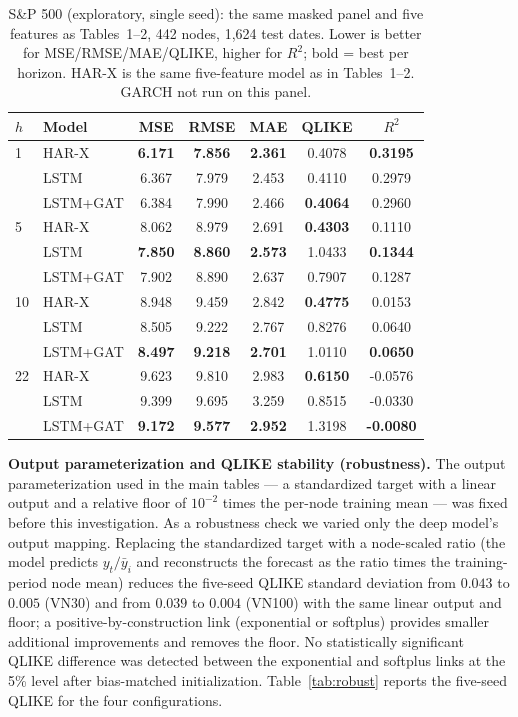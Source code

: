 \documentclass[runningheads]{llncs}
\begin{document}
\begin{table}[t]
\centering
\caption{S\&P 500 (exploratory, single seed): the same masked panel and five features as Tables~1--2, 442 nodes, 1{,}624 test dates. Lower is better for MSE/RMSE/MAE/QLIKE, higher for $R^2$; bold = best per horizon. HAR-X is the same five-feature model as in Tables~1--2. GARCH not run on this panel.}
\label{tab:sp500}
\footnotesize
\setlength{\tabcolsep}{5pt}
\begin{tabular}{llccccc}
\toprule
$h$ & Model & MSE & RMSE & MAE & QLIKE & $R^2$ \\
\midrule
1  & HAR-X     & \textbf{6.171} & \textbf{7.856} & \textbf{2.361} & 0.4078 & \textbf{0.3195} \\
   & LSTM     & 6.367 & 7.979 & 2.453 & 0.4110 & 0.2979 \\
   & LSTM+GAT & 6.384 & 7.990 & 2.466 & \textbf{0.4064} & 0.2960 \\
\midrule
5  & HAR-X     & 8.062 & 8.979 & 2.691 & \textbf{0.4303} & 0.1110 \\
   & LSTM     & \textbf{7.850} & \textbf{8.860} & \textbf{2.573} & 1.0433 & \textbf{0.1344} \\
   & LSTM+GAT & 7.902 & 8.890 & 2.637 & 0.7907 & 0.1287 \\
\midrule
10 & HAR-X     & 8.948 & 9.459 & 2.842 & \textbf{0.4775} & 0.0153 \\
   & LSTM     & 8.505 & 9.222 & 2.767 & 0.8276 & 0.0640 \\
   & LSTM+GAT & \textbf{8.497} & \textbf{9.218} & \textbf{2.701} & 1.0110 & \textbf{0.0650} \\
\midrule
22 & HAR-X     & 9.623 & 9.810 & 2.983 & \textbf{0.6150} & -0.0576 \\
   & LSTM     & 9.399 & 9.695 & 3.259 & 0.8515 & -0.0330 \\
   & LSTM+GAT & \textbf{9.172} & \textbf{9.577} & \textbf{2.952} & 1.3198 & \textbf{-0.0080} \\
\bottomrule
\end{tabular}
\end{table}

\textbf{Output parameterization and QLIKE stability (robustness).} The output parameterization used in the main tables --- a standardized target with a linear output and a relative floor of $10^{-2}$ times the per-node training mean --- was fixed before this investigation. As a robustness check we varied only the deep model's output mapping. Replacing the standardized target with a node-scaled ratio (the model predicts $y_t/\bar{y}_i$ and reconstructs the forecast as the ratio times the training-period node mean) reduces the five-seed QLIKE standard deviation from $0.043$ to $0.005$ (VN30) and from $0.039$ to $0.004$ (VN100) with the same linear output and floor; a positive-by-construction link (exponential or softplus) provides smaller additional improvements and removes the floor. No statistically significant QLIKE difference was detected between the exponential and softplus links at the 5\% level after bias-matched initialization. Table~\ref{tab:robust} reports the five-seed QLIKE for the four configurations.
\end{document}

